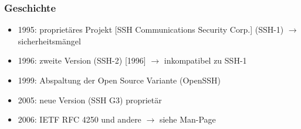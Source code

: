 \begin{frame}
\frametitle{Geschichte}
\begin{itemize}
\item 1995: proprietäres Projekt [SSH Communications Security Corp.] (SSH-1) $\rightarrow$ sicherheitsmängel
\item 1996: zweite Version (SSH-2) [1996] $\rightarrow$ inkompatibel zu SSH-1
\item 1999: Abspaltung der Open Source Variante (OpenSSH)
\item 2005: neue Version (SSH G3) proprietär
\item 2006: IETF RFC 4250 und andere $\rightarrow$ siehe Man-Page
\end{itemize}
\end{frame}